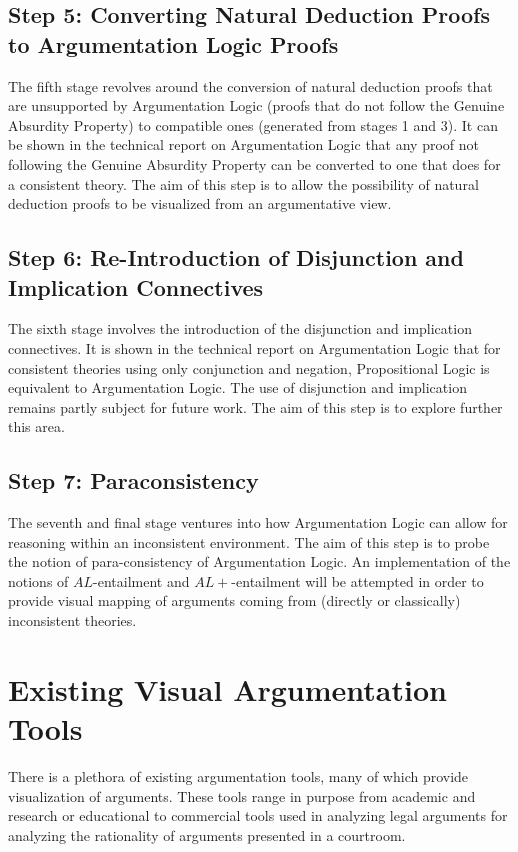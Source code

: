 \documentclass[11pt,twoside,a4paper]{report}
\begin{document}
\subsection{Step 5: Converting Natural Deduction Proofs to Argumentation Logic Proofs}
The fifth stage revolves around the conversion of natural deduction proofs that are unsupported by Argumentation Logic (proofs that do not follow the Genuine Absurdity Property) to compatible ones (generated from stages 1 and 3). It can be shown in the technical report on Argumentation Logic that any proof not following the Genuine Absurdity Property can be converted to one that does for a consistent theory. The aim of this step is to allow the possibility of natural deduction proofs to be visualized from an argumentative view.

\subsection{Step 6: Re-Introduction of Disjunction and Implication Connectives}
The sixth stage involves the introduction of the disjunction and implication connectives. It is shown in the technical report on Argumentation Logic that for consistent theories using only conjunction and negation, Propositional Logic is equivalent to Argumentation Logic. The use of disjunction and implication remains partly subject for future work. The aim of this step is to explore further this area.

\subsection{Step 7: Paraconsistency}
The seventh and final stage ventures into how Argumentation Logic can allow for reasoning within an inconsistent environment. The aim of this step is to probe the notion of para-consistency of Argumentation Logic. An implementation of the notions of $AL$-entailment and $AL+$-entailment will be attempted in order to provide visual mapping of arguments coming from (directly or classically) inconsistent theories.

\section{Existing Visual Argumentation Tools}
\label{sec:vizargtools}
There is a plethora of existing argumentation tools, many of which provide visualization of arguments. These tools range in purpose from academic and research or educational to commercial tools used in analyzing legal arguments for analyzing the rationality of arguments presented in a courtroom.
\end{document}
